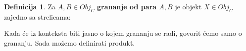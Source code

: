 \documentclass[11pt]{article}
\theoremstyle{definition}
\newtheorem{definition}{Definicija}
\begin{document}
  \begin{definition}
    Za $A, B \in Obj_C$ \textbf{grananje od para $A, B$} je objekt $X \in
    Obj_C$
    zajedno sa strelicama:
  \begin{center}
  \end{center}
  \end{definition}
  Kada će iz konteksta biti jasno o kojem grananju se radi, govorit ćemo
  samo o grananju. Sada možemo definirati produkt.
\end{document}

